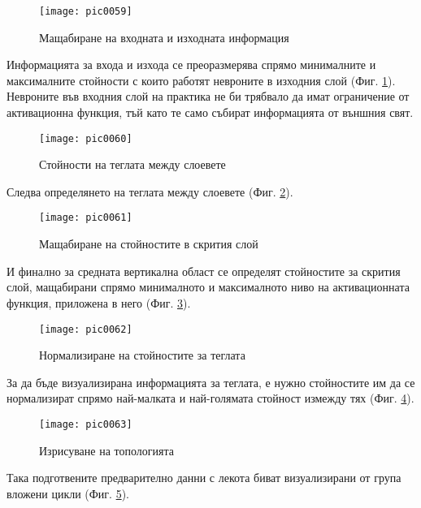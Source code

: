 \begin{figure}[h]
  \centering
  \texttt{[image: pic0059]}
  \caption{Мащабиране на входната и изходната информация}
\label{fig:pic0059}
\end{figure}
\FloatBarrier

Информацията за входа и изхода се преоразмерява спрямо минималните и максималните стойности с които работят невроните в изходния слой (Фиг. \ref{fig:pic0059}). Невроните във входния слой на практика не би трябвало да имат ограничение от активационна функция, тъй като те само събират информацията от външния свят. 

\begin{figure}[h]
  \centering
  \texttt{[image: pic0060]}
  \caption{Стойности на теглата между слоевете}
\label{fig:pic0060}
\end{figure}
\FloatBarrier

Следва определянето на теглата между слоевете (Фиг. \ref{fig:pic0060}).

\begin{figure}[h]
  \centering
  \texttt{[image: pic0061]}
  \caption{Мащабиране на стойностите в скрития слой}
\label{fig:pic0061}
\end{figure}
\FloatBarrier

И финално за средната вертикална област се определят стойностите за скрития слой, мащабирани спрямо минималното и максималното ниво на активационната функция, приложена в него (Фиг. \ref{fig:pic0061}).

\begin{figure}[h]
  \centering
  \texttt{[image: pic0062]}
  \caption{Нормализиране на стойностите за теглата}
\label{fig:pic0062}
\end{figure}
\FloatBarrier

За да бъде визуализирана информацията за теглата, е нужно стойностите им да се нормализират спрямо най-малката и най-голямата стойност измежду тях (Фиг. \ref{fig:pic0062}).

\begin{figure}[h]
  \centering
  \texttt{[image: pic0063]}
  \caption{Изрисуване на топологията}
\label{fig:pic0063}
\end{figure}
\FloatBarrier

Така подготвените предварително данни с лекота биват визуализирани от група вложени цикли (Фиг. \ref{fig:pic0063}).

